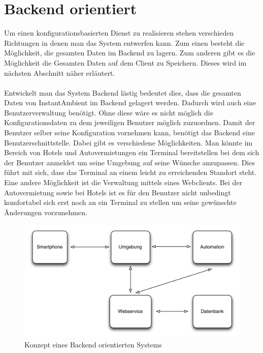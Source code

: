 \section{Backend orientiert}
Um einen konfigurationsbasierten Dienst zu realisieren stehen verschieden Richtungen in denen man das System entwerfen kann. 
Zum einen besteht die Möglichkeit, die gesamten Daten im Backend zu lagern. Zum anderen gibt es die Möglichkeit die Gesamten Daten auf dem Client zu Speichern. Dieses wird im nächsten Abschnitt näher erläutert.
\\\\
Entwickelt man das System Backend lästig bedeutet dies, dass die gesamten Daten von InstantAmbient im Backend gelagert werden. 
Dadurch wird auch eine Benutzerverwaltung benötigt. Ohne diese wäre es nicht möglich die Konfigurationsdaten zu dem jeweiligen Benutzer möglich zuzuordnen. Damit der Benutzer selber seine Konfiguration vornehmen kann, benötigt das Backend eine Benutzerschnittstelle. Dabei gibt es verschiedene Möglichkeiten. Man könnte im Bereich von Hotels und Autovermietungen ein Terminal bereitstellen bei dem sich der Benutzer anmeldet um seine Umgebung auf seine Wünsche anzupassen. Dies führt mit sich, dass das Terminal an einem leicht zu erreichenden Standort steht. Eine andere Möglichkeit ist die Verwaltung mittels eines Webclients. Bei der Autovermietung sowie bei Hotels ist es für den Benutzer nicht unbedingt komfortabel sich erst noch an ein Terminal zu stellen um seine gewünschte Änderungen vorzunehmen. 
\begin{figure}[H]
\includegraphics[width=12.5cm]{images/backend}
\caption{Konzept eines Backend orientierten Systems}
\end{figure}

